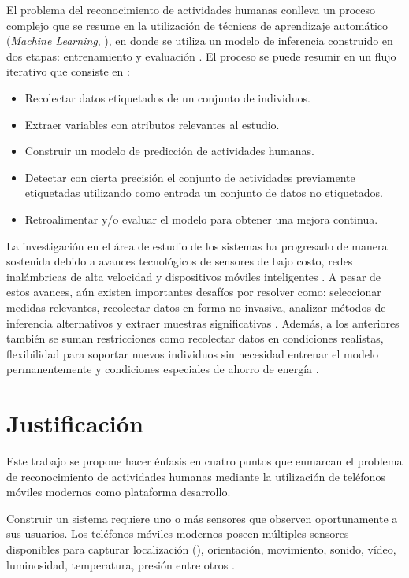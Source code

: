 El problema del reconocimiento de actividades humanas conlleva un
proceso complejo que se resume en la utilización de técnicas de aprendizaje
automático (\emph{Machine Learning}, ), en donde se utiliza
un modelo de inferencia construido en dos etapas: entrenamiento y
evaluación \cite{LaraLabrador2013,Kwapisz2011}. El proceso se puede
resumir en un flujo iterativo que consiste en \cite{Bao2004}:
\begin{itemize}
\item Recolectar datos etiquetados de un conjunto de individuos. 
\item Extraer variables con atributos relevantes al estudio.
\item Construir un modelo de predicción de actividades humanas.
\item Detectar con cierta precisión el conjunto de actividades previamente
etiquetadas utilizando como entrada un conjunto de datos no etiquetados.
\item Retroalimentar y/o evaluar el modelo para obtener una mejora continua.
\end{itemize}
La investigación en el área de estudio de los sistemas 
ha progresado de manera sostenida debido a avances tecnológicos de
sensores de bajo costo, redes inalámbricas de alta velocidad y dispositivos
móviles inteligentes \cite{Chen2012}. A pesar de estos avances, aún
existen importantes desafíos por resolver como: seleccionar medidas
relevantes, recolectar datos en forma no invasiva, analizar métodos
de inferencia alternativos y extraer muestras significativas \cite{LaraLabrador2013}.
Además, a los anteriores también se suman restricciones como recolectar
datos en condiciones realistas, flexibilidad para soportar nuevos
individuos sin necesidad entrenar el modelo permanentemente y condiciones
especiales de ahorro de energía \cite{ReyesOrtiz2015}. 

\section{Justificación}

\label{sec12:justificaciuxf3n}Este trabajo se propone hacer énfasis
en cuatro puntos que enmarcan el problema de reconocimiento de actividades
humanas mediante la utilización de teléfonos móviles modernos como
plataforma desarrollo.

Construir un sistema  requiere uno o más sensores que observen
oportunamente a sus usuarios. Los teléfonos móviles modernos poseen
múltiples sensores disponibles para capturar localización (),
orientación, movimiento, sonido, vídeo, luminosidad, temperatura,
presión entre otros \cite{Kwapisz2011}.

